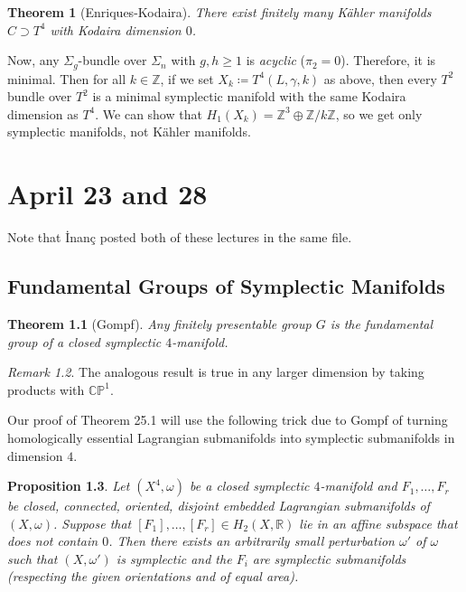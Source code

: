 \documentclass[leqno, openany]{memoir}
\newtheorem{thm}{Theorem}[chapter]
\newtheorem{prop}[thm]{Proposition}
\theoremstyle{definition}
\theoremstyle{remark}
\newtheorem{rmk}[thm]{Remark}
\theoremstyle{plain}
\theoremstyle{definition}
\theoremstyle{remark}
\newcommand{\R}{\mathbb{R}}
\newcommand{\C}{\mathbb{C}}
\newcommand{\Z}{\mathbb{Z}}
\renewcommand{\P}{\mathbb{P}}
\begin{document}
    \begin{thm}[Enriques-Kodaira]
        There exist finitely many K\"ahler manifolds $C \supset T^4$ with Kodaira dimension $0$.
    \end{thm}

    Now, any $\Sigma_g$-bundle over $\Sigma_n$ with $g,h \geq 1$ is \textit{acyclic} ($\pi_2 = 0$). Therefore, it is minimal. Then for all $k \in \Z$, if we set $X_k \coloneqq T^4(L, \gamma, k)$ as above, then every $T^2$ bundle over $T^2$ is a minimal symplectic manifold with the same Kodaira dimension as $T^4$. We can show that $H_1(X_k) = \Z^3 \oplus \Z/k\Z$, so we get only symplectic manifolds, not K\"ahler manifolds.

    \chapter{April 23 and 28}%
    \label{cha:april_23_and_28}
    
    Note that \.Inan\c{c} posted both of these lectures in the same file.

    \section{Fundamental Groups of Symplectic Manifolds}%
    \label{sec:topology_of_symplectic_4_manifolds}
    
    \begin{thm}[Gompf]
        Any finitely presentable group $G$ is the fundamental group of a closed symplectic $4$-manifold.
    \end{thm}

    \begin{rmk}
        The analogous result is true in any larger dimension by taking products with $\C\P^1$.
    \end{rmk}

    Our proof of Theorem 25.1 will use the following trick due to Gompf of turning homologically essential Lagrangian submanifolds into symplectic submanifolds in dimension $4$.

    \begin{prop}
        Let $(X^4, \omega)$ be a closed symplectic $4$-manifold and $F_1, \ldots, F_r$ be closed, connected, oriented, disjoint embedded Lagrangian submanifolds of $(X, \omega)$. Suppose that $[F_1], \ldots, [F_r] \in H_2(X, \R)$ lie in an affine subspace that does not contain $0$. Then there exists an arbitrarily small perturbation $\omega'$ of $\omega$ such that $(X, \omega')$ is symplectic and the $F_i$ are symplectic submanifolds (respecting the given orientations and of equal area).
    \end{prop}
\end{document}
